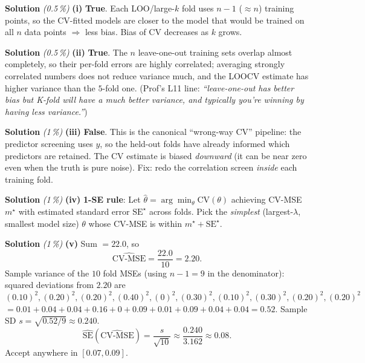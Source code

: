 \documentclass[11pt,a4paper]{article}
\newcommand{\subpoints}[1]{\textit{(#1\,\%)}}
\newcommand{\sol}{\noindent\textbf{Solution}}
\begin{document}
\sol{} \subpoints{0.5} \textbf{(i)} \textbf{True}. Each LOO/large-$k$ fold uses $n-1$ ($\approx n$)
training points, so the CV-fitted models are closer to the model that would be trained on all $n$
data points $\Rightarrow$ less bias. Bias of CV decreases as $k$ grows.

\medskip
\sol{} \subpoints{0.5} \textbf{(ii)} \textbf{True}. The $n$ leave-one-out training sets overlap
almost completely, so their per-fold errors are highly correlated; averaging strongly correlated
numbers does not reduce variance much, and the LOOCV estimate has higher variance than the
$5$-fold one. (Prof's L11 line: \emph{``leave-one-out has better bias but K-fold will have a much
better variance, and typically you're winning by having less variance.''})

\medskip
\sol{} \subpoints{1} \textbf{(iii)} \textbf{False}. This is the canonical ``wrong-way CV''
pipeline: the predictor screening uses $y$, so the held-out folds have already informed which
predictors are retained. The CV estimate is biased \emph{downward} (it can be near zero even when
the truth is pure noise). Fix: redo the correlation screen \emph{inside} each training fold.

\medskip
\sol{} \subpoints{1} \textbf{(iv)} \textbf{1-SE rule}: Let $\hat\theta=\arg\min_\theta
\mathrm{CV}(\theta)$ achieving CV-MSE $m^\star$ with estimated standard error $\mathrm{SE}^\star$
across folds. Pick the \emph{simplest} (largest-$\lambda$, smallest model size) $\theta$ whose
CV-MSE is within $m^\star+\mathrm{SE}^\star$.

\medskip
\sol{} \subpoints{1} \textbf{(v)} Sum $=22.0$, so
$$\widehat{\mathrm{CV}\text{-MSE}}=\frac{22.0}{10}=\boxed{2.20}.$$
Sample variance of the $10$ fold MSEs (using $n-1=9$ in the denominator): squared deviations from
$2.20$ are $(0.10)^2,(0.20)^2,(0.20)^2,(0.40)^2,(0)^2,(0.30)^2,(0.10)^2,(0.30)^2,(0.20)^2,(0.20)^2$
$=0.01+0.04+0.04+0.16+0+0.09+0.01+0.09+0.04+0.04=0.52$. Sample SD $s=\sqrt{0.52/9}\approx 0.240$.
$$\widehat{\mathrm{SE}}(\widehat{\mathrm{CV}\text{-MSE}})=\frac{s}{\sqrt{10}}\approx\frac{0.240}{3.162}\approx\boxed{0.08}.$$
Accept anywhere in $[0.07, 0.09]$.
\end{document}

